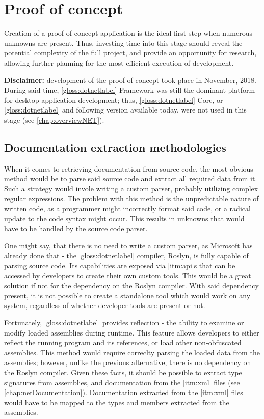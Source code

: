 \chapter{Proof of concept}

Creation of a proof of concept application is the ideal first step when numerous unknowns are present. Thus, investing time into this stage should reveal the potential complexity of the full project, and provide an opportunity for research, allowing further planning for the most efficient execution of development.

\textbf{Disclaimer:}
development of the proof of concept took place in November, 2018. During said time, \ref{gloss:dotnetlabel} Framework was still the dominant platform for desktop application development; thus, \ref{gloss:dotnetlabel} Core, or \ref{gloss:dotnetlabel} and following version available today, were not used in this stage (see \ref{chap:overviewNET}).

\section{Documentation extraction methodologies}
When it comes to retrieving documentation from source code, the most obvious method would be to parse said source code and extract all required data from it. Such a strategy would invole writing a custom parser, probably utilizing complex regular expressions. The problem with this method is the unpredictable nature of written code, as a programmer might incorrectly format said code, or a radical update to the code syntax might occur. This results in unknowns that would have to be handled by the source code parser.

One might say, that there is no need to write a custom parser, as Microsoft has already done that - the \ref{gloss:dotnetlabel} compiler, Roslyn, is fully capable of parsing source code. Its capabilities are exposed via \ref{itm:api}s that can be accessed by developers to create their own custom tools. This would be a great solution if not for the dependency on the Roslyn compiler. With said dependency present, it is not possible to create a standalone tool which would work on any system, regardless of whether developer tools are present or not.

Fortunately, \ref{gloss:dotnetlabel} provides reflection - the ability to examine or modify loaded assemblies during runtime. This feature allows developers to either reflect the running program and its references, or load other non-obfuscated assemblies. This method would require correclty parsing the loaded data from the assemblies; however, unlike the previous alternative, there is no dependency on the Roslyn compiler. Given these facts, it should be possible to extract type signatures from assemblies, and documentation from the \ref{itm:xml} files (see \ref{chap:netDocumentation}). Documentation extracted from the \ref{itm:xml} files would have to be mapped to the types and members extracted from the assemblies.

